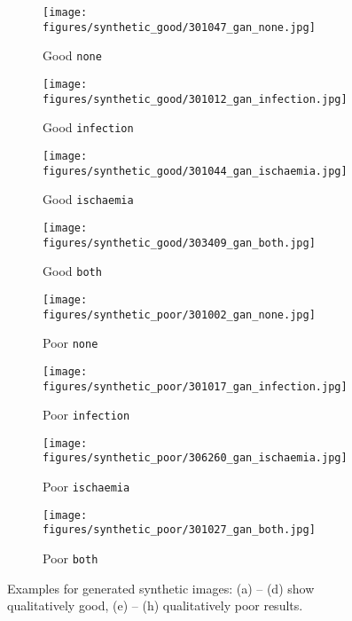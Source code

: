 \documentclass[runningheads]{llncs}
\begin{document}
\begin{figure}[ht!]
    \centering
    \begin{subfigure}[b]{0.24\textwidth}
        \centering
        \texttt{[image: figures/synthetic\_good/301047\_gan\_none.jpg]}
        \caption{Good \texttt{none}}
        \label{fig:gan_examples_a}
    \end{subfigure}
    \hfill
    \begin{subfigure}[b]{0.24\textwidth}
        \centering
        \texttt{[image: figures/synthetic\_good/301012\_gan\_infection.jpg]}
        \caption{Good \texttt{infection}}
        \label{fig:gan_examples_b}
    \end{subfigure}
    \hfill
    \begin{subfigure}[b]{0.24\textwidth}
        \centering
        \texttt{[image: figures/synthetic\_good/301044\_gan\_ischaemia.jpg]}
        \caption{Good \texttt{ischaemia}}
        \label{fig:gan_examples_c}
    \end{subfigure}
    \hfill
    \begin{subfigure}[b]{0.24\textwidth}
        \centering
        \texttt{[image: figures/synthetic\_good/303409\_gan\_both.jpg]}
        \caption{Good \texttt{both}}
        \label{fig:gan_examples_d}
    \end{subfigure}
    \begin{subfigure}[b]{0.24\textwidth}
        \centering
        \texttt{[image: figures/synthetic\_poor/301002\_gan\_none.jpg]}
        \caption{Poor \texttt{none}}
        \label{fig:gan_examples_e}
    \end{subfigure}
    \hfill
    \begin{subfigure}[b]{0.24\textwidth}
        \centering
        \texttt{[image: figures/synthetic\_poor/301017\_gan\_infection.jpg]}
        \caption{Poor \texttt{infection}}
        \label{fig:gan_examples_f}
    \end{subfigure}
    \hfill
    \begin{subfigure}[b]{0.24\textwidth}
        \centering
        \texttt{[image: figures/synthetic\_poor/306260\_gan\_ischaemia.jpg]}
        \caption{Poor \texttt{ischaemia}}
        \label{fig:gan_examples_g}
    \end{subfigure}
    \hfill
    \begin{subfigure}[b]{0.24\textwidth}
        \centering
        \texttt{[image: figures/synthetic\_poor/301027\_gan\_both.jpg]}
        \caption{Poor \texttt{both}}
        \label{fig:gan_examples_h}
    \end{subfigure}
    \caption{Examples for generated synthetic images: (a) -- (d) show qualitatively good, (e) -- (h) qualitatively poor results.}
    \label{fig:gan_examples}
\end{figure}
\end{document}
